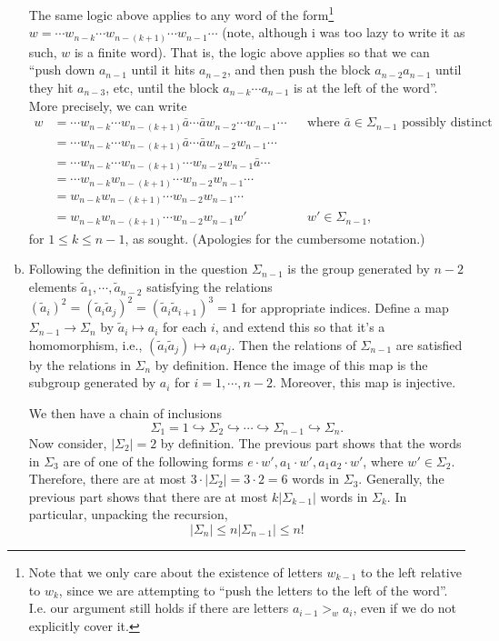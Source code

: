 \documentclass[12pt,letterpaper,boxed]{hmcpset}
\newcommand{\abs}[1]{\left|#1\right|}
\begin{document}
\begin{solution}
\begin{enumerate}[(a)]
The same logic above applies to any word of the form\footnote{
	Note that we only care about the existence of letters $w_{k-1}$ to
	the left
	relative to $w_{k}$, since we are attempting to ``push the letters
	to the left of the word''. I.e. our argument still holds if there
	are letters $a_{i-1} >_w a_{i}$, even if we do not explicitly
	cover it.
} 
	$w = \cdots w_{n - k} \cdots w_{n -(k+1)} \cdots w_{n-1} \cdots $
	(note, although i was too lazy to write it as such, $w$ is a finite
	word). 
	That is, the logic above applies so that we can ``push down
	$a_{n-1}$ until it hits $a_{n-2}$, and then push the block
	$a_{n-2}a_{n-1}$ until they hit $a_{n-3}$, etc, until the block
	$a_{n-k}\cdots a_{n-1}$ is at the left of the word''. More 
	precisely, we 
	can write
\begin{align*}
	w 
	&= \cdots w_{n - k} \cdots w_{n-(k+1)}\bar a \cdots \bar a w_{n-2} \cdots w_{n-1} \cdots && \text{where $\bar a \in \Sigma_{n-1}$ possibly distinct} \\
	&= \cdots w_{n - k} \cdots w_{n-(k+1)}\bar a \cdots \bar a w_{n-2} w_{n-1} \cdots \\
	&= \cdots w_{n - k} \cdots w_{n-(k+1)} \cdots w_{n-2} w_{n-1} \bar a \cdots \\
	&= \cdots w_{n - k} w_{n-(k+1)} \cdots w_{n-2} w_{n-1} \cdots \\
	&= w_{n - k} w_{n-(k+1)} \cdots w_{n-2} w_{n-1} \cdots \\
	&= w_{n - k} w_{n-(k+1)} \cdots w_{n-2} w_{n-1} w' && w' \in \Sigma_{n-1},
\end{align*}
for $1 \leq k \leq n-1$, as sought. (Apologies for the cumbersome notation.)

\item 
Following the definition in the question $\Sigma_{n-1}$ is the group
generated by $n-2$ elements $\tilde a_1, \cdots, \tilde a_{n-2}$
satisfying the relations $(\tilde a_i)^2 = (\tilde a_i \tilde a_j)^2 =
(\tilde a_i \tilde a_{i+1})^3 = 1$ for appropriate indices. Define a
map $\Sigma_{n-1} \to \Sigma_n$ by $\tilde a_i \mapsto a_i$ for each
$i$, and extend this so that it's a homomorphism, i.e., $(\tilde a_i
\tilde a_j) \mapsto a_i a_j$. Then the relations of $\Sigma_{n-1}$ are
satisfied by the relations in $\Sigma_{n}$ by definition. Hence the
image of this map is the subgroup generated by $a_i$ for $i = 1,
\cdots, n-2$. Moreover, this map is injective.

We then have a chain of inclusions \[
	\Sigma_1 = 1 \hookrightarrow \Sigma_2 \hookrightarrow \cdots
	\hookrightarrow \Sigma_{n-1} \hookrightarrow \Sigma_{n}.
\]
Now consider, $\abs{\Sigma_2} = 2$ by definition. The previous
	part shows that the words in $\Sigma_3$ are of one of the
	following forms $e \cdot
	w', a_1 \cdot w', a_1 a_2 \cdot w'$, where $w' \in \Sigma_2$.
	Therefore, there are at most $3 \cdot \abs{\Sigma_2} = 3 \cdot 2 = 6$
	words in $\Sigma_3$. 
	Generally, the previous part shows that there are at most $k
	\abs{\Sigma_{k-1}}$ words in $\Sigma_k$. In particular, unpacking
	the recursion, \[
		\abs{\Sigma_n} \leq n \abs{\Sigma_{n-1}} \leq n!
	\]


\end{enumerate}
\end{solution}
\end{document}

